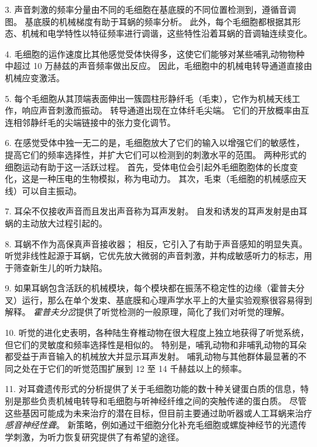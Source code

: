 3. 声音刺激的频率分量由不同的毛细胞在基底膜的不同位置检测到，遵循音调图。
基底膜的机械梯度有助于耳蜗的频率分析。
此外，每个毛细胞都根据其形态、机械和电学特性以特征频率进行调谐，这些特性沿着耳蜗的音调轴连续变化。 


4. 毛细胞的运作速度比其他感觉受体快得多，这使它们能够对某些哺乳动物物种中超过 10 万赫兹的声音频率做出反应。
因此，毛细胞中的机械电转导通道直接由机械应变激活。 


5. 每个毛细胞从其顶端表面伸出一簇圆柱形静纤毛（毛束），它作为机械天线工作，响应声音刺激而振动。
转导通道出现在立体纤毛尖端。
它们的开放概率由互连相邻静纤毛的尖端链接中的张力变化调节。


6. 在感觉受体中独一无二的是，毛细胞放大了它们的输入以增强它们的敏感性，提高它们的频率选择性，并扩大它们可以检测到的刺激水平的范围。
两种形式的细胞运动有助于这一活跃过程。
首先，受体电位会引起外毛细胞胞体的长度变化，这是一种压电的生物模拟，称为电动力。
其次，毛束（毛细胞的机械感应天线）可以自主振动。


7. 耳朵不仅接收声音而且发出声音称为耳声发射。
自发和诱发的耳声发射是由耳蜗的主动放大过程引起的。 


8. 耳蜗不作为高保真声音接收器；
相反，它引入了有助于声音感知的明显失真。
听觉非线性起源于耳蜗，它优先放大微弱的声音刺激，并构成敏感听力的标志，用于筛查新生儿的听力缺陷。


9. 如果耳蜗包含活跃的机械模块，每个模块都在振荡不稳定性的边缘（霍普夫分叉）运行，那么在单个发束、基底膜和心理声学水平上的大量实验观察很容易得到解释。
\textit{霍普夫分岔}提供了听觉检测的一般原理，简化了我们对听觉的理解。


10. 听觉的进化史表明，各种陆生脊椎动物在很大程度上独立地获得了听觉系统，但它们的灵敏度和频率选择性是相似的。
特别是，哺乳动物和非哺乳动物的耳朵都受益于声音输入的机械放大并显示耳声发射。
哺乳动物与其他群体最显著的不同之处在于它们的听觉范围扩展到 12 至 14 千赫兹以上的频率。


11. 对耳聋遗传形式的分析提供了关于毛细胞功能的数十种关键蛋白质的信息，特别是那些负责机械电转导和毛细胞与听神经纤维之间的突触传递的蛋白质。
尽管这些基因可能成为未来治疗的潜在目标，但目前主要通过助听器或人工耳蜗来治疗\textit{感音神经性聋}。
新策略，例如通过干细胞分化补充毛细胞或螺旋神经节的光遗传学刺激，为听力恢复研究提供了有希望的途径。


